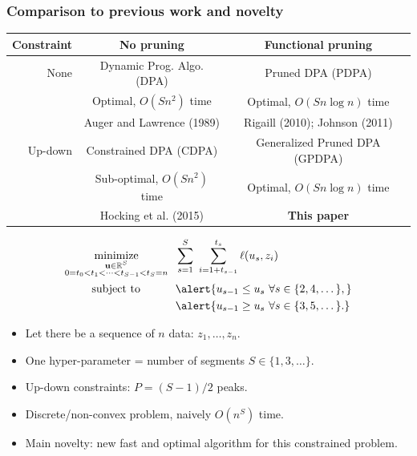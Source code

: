 \documentclass[t]{beamer}
\DeclareMathOperator*{\minimize}{minimize}
\newcommand{\RR}{\mathbb R}
\begin{document}
\begin{frame}
  \frametitle{Comparison to previous work and novelty}
{  \scriptsize
    \begin{tabular}{r|c|c}
    Constraint & No pruning & Functional pruning \\
    \hline
    None & Dynamic Prog. Algo. (DPA) & Pruned DPA (PDPA) \\
    & Optimal, $O(Sn^2)$ time & Optimal, $O(Sn\log n)$ time\\
    & Auger and Lawrence (1989) & Rigaill (2010); Johnson (2011) \\
    \hline
    Up-down & Constrained DPA (CDPA) & Generalized Pruned DPA (GPDPA) \\
    & Sub-optimal, $O(Sn^2)$ time & Optimal, $O(Sn\log n)$ time\\
    & Hocking et al. (2015) & \textbf{This paper} \\
    \hline
  \end{tabular}
}
\begin{align*}
    \minimize_{\substack{
  \mathbf u\in\RR^{S}
\\
   0=t_0<t_1<\cdots<t_{S-1}<t_S=n
  }} &\ \ 
    \sum_{s=1}^S\  \sum_{i=1+t_{s-1}}^{t_s} \ell( u_s,  z_i) 
\\
      \text{subject to \hskip 0.75cm} &\ \ \alert{u_{s-1} \leq u_s\ \forall s\in\{2,4,\dots\},}
  \nonumber\\
  &\ \ \alert{u_{s-1} \geq u_s\ \forall s\in\{3,5,\dots\}.}
  \nonumber 
\end{align*}
\vskip -0.4cm
\begin{itemize}  
\item Let there be a sequence of $n$ data: $z_1,\dots,z_n$.
\item One hyper-parameter = number of segments $S\in\{1,3,\dots\}$.
\item \alert{Up-down constraints: $P=(S-1)/2$ peaks.}
\item Discrete/non-convex problem, naively $O(n^S)$ time.
\item Main novelty: new fast and optimal algorithm for this constrained
  problem.
\end{itemize}


\end{frame}
\end{document}
